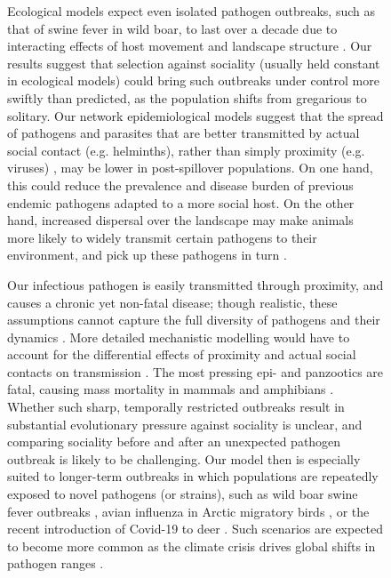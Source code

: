\begin{figure}[!h]
Ecological models expect even isolated pathogen outbreaks, such as that of swine fever in wild boar, to last over a decade due to interacting effects of host movement and landscape structure \citep{scherer2020}.
Our results suggest that selection against sociality (usually held constant in ecological models) could bring such outbreaks under control more swiftly than predicted, as the population shifts from gregarious to solitary.
Our network epidemiological models suggest that the spread of pathogens and parasites that are better transmitted by actual social contact (e.g. helminths), rather than simply proximity (e.g. viruses) \citep{rimbach2015}, may be lower in post-spillover populations.
On one hand, this could reduce the prevalence and disease burden of previous endemic pathogens adapted to a more social host.
On the other hand, increased dispersal over the landscape may make animals more likely to widely transmit certain pathogens to their environment, and pick up these pathogens in turn \citep[][]{rimbach2015,scherer2020}.

Our infectious pathogen is easily transmitted through proximity, and causes a chronic yet non-fatal disease; though realistic, these assumptions cannot capture the full diversity of pathogens and their dynamics \citep{white2018,scherer2020, lunn2021}.
More detailed mechanistic modelling would have to account for the differential effects of proximity and actual social contacts on transmission \citep{rimbach2015}.
The most pressing epi- and panzootics are fatal, causing mass mortality in mammals \citep{blehert2009, fereidouni2019} and amphibians \citep{scheele2019,sanderson2020}.
Whether such sharp, temporally restricted outbreaks result in substantial evolutionary pressure against sociality is unclear, and comparing sociality before and after an unexpected pathogen outbreak is likely to be challenging.
Our model then is especially suited to longer-term outbreaks in which populations are repeatedly exposed to novel pathogens (or strains), such as wild boar swine fever outbreaks \citep{scherer2020}, avian influenza in Arctic migratory birds \citep{globconsorth5n82016}, or the recent introduction of Covid-19 to deer \citep{kuchipudi2022}.
Such scenarios are expected to become more common as the climate crisis drives global shifts in pathogen ranges \citep{carlson2021}.


\end{figure}
